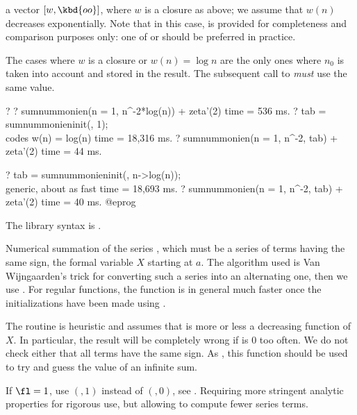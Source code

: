 \item a vector $[w, \kbd{oo}]$, where $w$ is a closure as above;
we assume that $w(n)$ decreases exponentially. Note that in this case,
 is provided for completeness and comparison purposes only:
one of  or  should be preferred in practice.

The cases where $w$ is a closure or $w(n) = \log n$ are the only ones where
$n_0$ is taken into account and stored in the result. The subsequent call to
 \emph{must} use the same value.

\bprog
? 
? sumnummonien(n = 1, n^-2*log(n)) + zeta'(2)
time = 536 ms.
? tab = sumnummonieninit(, 1); \\ codes w(n) = log(n)
time = 18,316 ms.
? sumnummonien(n = 1, n^-2, tab) + zeta'(2)
time = 44 ms.

? tab = sumnummonieninit(, n->log(n)); \\ generic, about as fast
time = 18,693 ms.
? sumnummonien(n = 1, n^-2, tab) + zeta'(2)
time = 40 ms.
@eprog

The library syntax is .

\label{se:sumpos}
Numerical summation of the series , which must be a series of
terms having the same sign, the formal variable $X$ starting at $a$. The
algorithm used is Van Wijngaarden's trick for converting such a series into
an alternating one, then we use . For regular functions, the
function  is in general much faster once the initializations
have been made using .

The routine is heuristic and assumes that  is more or less a
decreasing function of $X$. In particular, the result will be completely
wrong if  is 0 too often. We do not check either that all terms
have the same sign. As , this function should be used to
try and guess the value of an infinite sum.

If $\fl=1$, use $(,1)$ instead of $(,0)$, see
. Requiring more stringent analytic properties for
rigorous use, but allowing to compute fewer series terms.

